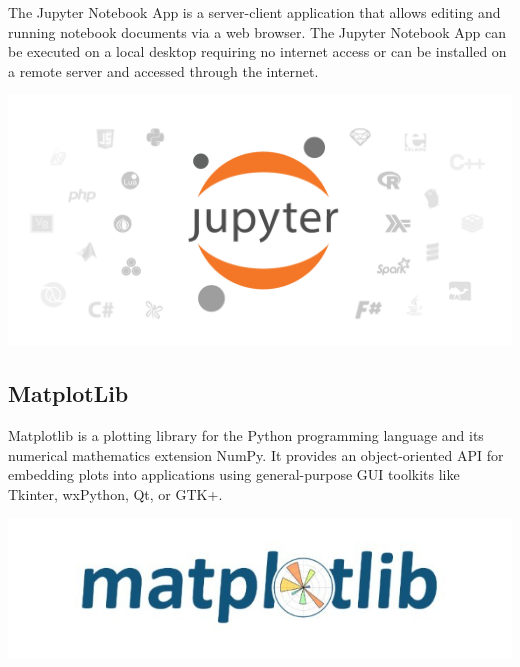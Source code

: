 \begin{minipage}{0.68\textwidth}
The Jupyter Notebook App is a server-client application that allows editing and running notebook documents via a web browser. The Jupyter Notebook App can be executed on a local desktop requiring no internet access or can be installed on a remote server and accessed through the internet.\cite{ref46}

\end{minipage}%
%
\begin{minipage}{0.3\textwidth}
  \hspace*{.4cm}
  \includegraphics[width=\textwidth]{images/jupyter_notebook}
\end{minipage}


\subsection{MatplotLib}

\begin{minipage}{0.68\textwidth}

Matplotlib is a plotting library for the Python programming language and its numerical mathematics extension NumPy. It provides an object-oriented API for embedding plots into applications using general-purpose GUI toolkits like Tkinter, wxPython, Qt, or GTK+.\cite{ref45}
\end{minipage}%
%
\begin{minipage}{0.3\textwidth}
  \hspace*{.4cm}
  \includegraphics[width=\textwidth]{images/matplot_lib}
\end{minipage}


